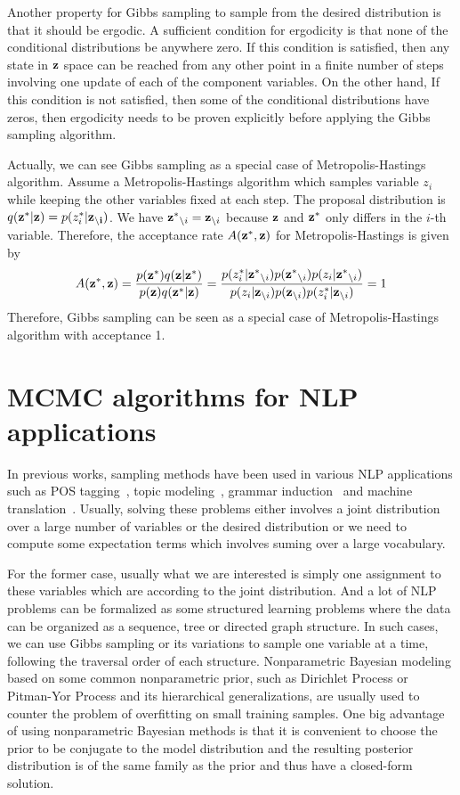 Another property for Gibbs sampling to sample from the desired distribution is that it should be ergodic. A sufficient condition for ergodicity is that none of the conditional distributions be anywhere zero. If this condition is satisfied, then any state in ${\bf z}$ space can be reached from any other point in a finite number of steps involving one update of each of the component variables. 
On the other hand, If this condition is not satisfied, then some of the conditional
distributions have zeros, then ergodicity needs to be proven explicitly before applying the Gibbs sampling algorithm.


Actually, we can see Gibbs sampling as a special case of Metropolis-Hastings algorithm. Assume a Metropolis-Hastings algorithm which samples variable $z_i$ while keeping
the other variables fixed at each step. 
The proposal distribution is $q({\bf z^*}|{\bf z})=p(z_i^*|{\bf z_{\setminus i}})$. We have ${\bf z^*}_{\setminus i} = {\bf z}_{\setminus i}$ because 
${\bf z}$ and ${\bf z^*}$ only differs in the $i$-th variable. Therefore, the acceptance rate $A({\bf z^*}, {\bf z})$ for Metropolis-Hastings is given by
$$A({\bf z^*}, {\bf z}) = \frac{p({\bf z^*})q({\bf z}|{\bf z^*})}{p({\bf z})q({\bf z^*}|{\bf z})} = \frac{p(z_i^* |{\bf z^*}_{\setminus i})p({\bf z^*}_{\setminus i})p(z_i |{\bf z^*}_{\setminus i})}{p(z_i |{\bf z}_{\setminus i})p({\bf z}_{\setminus i})p(z_i^* |{\bf z}_{\setminus i})}=1$$
Therefore, Gibbs sampling can be seen as a special case of Metropolis-Hastings algorithm with acceptance 1.
\section{MCMC algorithms for NLP applications}
In previous works, sampling methods have been used in various NLP applications such as POS tagging~\cite{finkel2005incorporating}, topic modeling~\cite{wallach2006topic,steyvers2007probabilistic}, grammar induction~\cite{cohn-2009-inducing,PostGildea-acl09} and machine translation~\cite{denero2008sampling}. 
Usually, solving these problems either involves a joint distribution over a large number of variables or the desired distribution
or we need to compute some expectation terms which involves suming over a large vocabulary.


For the former case, usually what we are interested is simply one assignment to these variables which are according to
the joint distribution. And a lot of NLP problems can be formalized as some structured learning problems where the data can
be organized as a sequence, tree or directed graph structure.
In such cases, we can use Gibbs sampling or its variations to sample one variable at a time, following the traversal order of each structure.
Nonparametric Bayesian modeling based on some common nonparametric prior, such as Dirichlet Process or Pitman-Yor Process and its hierarchical generalizations, 
are usually used to counter the problem of overfitting on small training samples.
One big advantage of using nonparametric Bayesian methods is that it is convenient to choose the prior to be conjugate to the model
distribution and the resulting posterior distribution is of the same family as the prior and thus have a closed-form solution.


